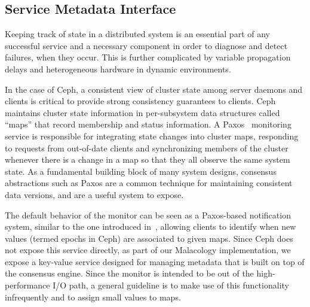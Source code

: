 \subsection{Service Metadata Interface}
\label{sec:mon}
\label{sec:service-metadata-interface}
\label{service-metadata}

Keeping track of state in a distributed system is an essential part of any
successful service and a necessary component in order to diagnose and detect
failures, when they occur. This is further complicated by variable propagation
delays and heterogeneous hardware in dynamic environments.
 

 In the
case of Ceph, a consistent view of cluster state among server daemons and
clients is critical to provide strong consistency guarantees to clients.  Ceph
maintains cluster state information in per-subsystem  data structures called
``maps'' that record membership and status information.  A
Paxos~\cite{lamport_parttime_1998} monitoring service is responsible for
integrating state changes into cluster maps, responding to requests from
out-of-date clients and synchronizing members of the cluster whenever there is
a change in a map so that they all observe the same system state. As a
fundamental building block of many system designs, consensus abstractions such
as Paxos are a common technique for maintaining consistent data versions, and
are a useful system to expose.

The default behavior of the monitor can be seen as a Paxos-based notification
system, similar to the one introduced in~\cite{burrows_chubby_2006}, allowing
clients to identify when new values (termed epochs in Ceph) are associated to
given maps.  Since Ceph does not expose this service directly, as part of our
Malacology implementation, we expose a key-value service designed for managing
  metadata that is built on
top of the consensus engine. Since the monitor is intended to be out of the
high-performance I/O path, a general guideline is to make use of this
functionality infrequently and to assign small values to maps.\\

